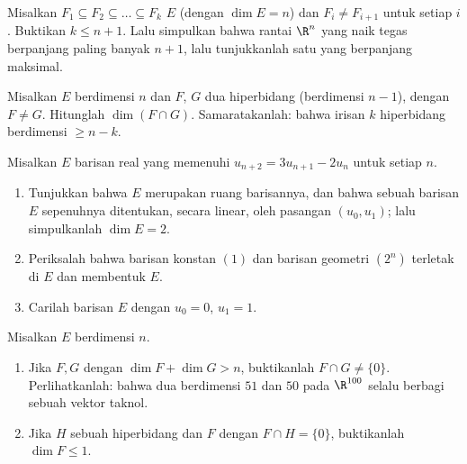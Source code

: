 \begin{exercise}[$\star\star\star$]\label{exo:b1:findim:8}
Misalkan $F_1 \subseteq F_2 \subseteq \dots \subseteq F_k$ 
$E$ (dengan $\dim E = n$) dan $F_i \neq F_{i+1}$ untuk setiap $i$. Buktikan $k
\leq n + 1$. Lalu simpulkan bahwa rantai  $\R^n$ yang naik tegas
berpanjang paling banyak $n + 1$, lalu tunjukkanlah satu yang berpanjang
maksimal.
\end{exercise}

\begin{exercise}[$\star\star\star$]\label{exo:b1:findim:9}
Misalkan $E$ berdimensi $n$ dan $F$, $G$ dua hiperbidang (berdimensi
$n - 1$), dengan $F \neq G$. Hitunglah $\dim(F \cap G)$. Samaratakanlah: bahwa
irisan $k$ hiperbidang berdimensi $\geq n - k$.
\end{exercise}

\begin{exercise}[$\star\star$]\label{exo:b1:findim:10}
Misalkan $E$  barisan real yang memenuhi $u_{n+2} =
3u_{n+1} - 2u_n$ untuk setiap $n$.
\begin{enumerate}
  \item Tunjukkan bahwa $E$ merupakan  ruang barisannya, dan
        bahwa sebuah barisan $E$ sepenuhnya ditentukan, secara linear,
        oleh pasangan $(u_0, u_1)$; lalu simpulkanlah $\dim E = 2$.
  \item Periksalah bahwa barisan konstan $(1)$ dan barisan geometri
        $(2^n)$ terletak di $E$ dan membentuk  $E$.
  \item Carilah barisan $E$ dengan $u_0 = 0$, $u_1 = 1$.
\end{enumerate}
\end{exercise}

\begin{exercise}[$\star\star$]\label{exo:b1:findim:11}
Misalkan $E$ berdimensi $n$.
\begin{enumerate}
  \item Jika $F, G$  dengan $\dim F + \dim G > n$, buktikanlah
        $F \cap G \neq \{0\}$. Perlihatkanlah: bahwa dua 
        berdimensi $51$ dan $50$ pada $\R^{100}$ selalu berbagi sebuah
        vektor taknol.
  \item Jika $H$ sebuah hiperbidang dan $F$  dengan $F \cap H =
        \{0\}$, buktikanlah $\dim F \leq 1$.
\end{enumerate}
\end{exercise}

